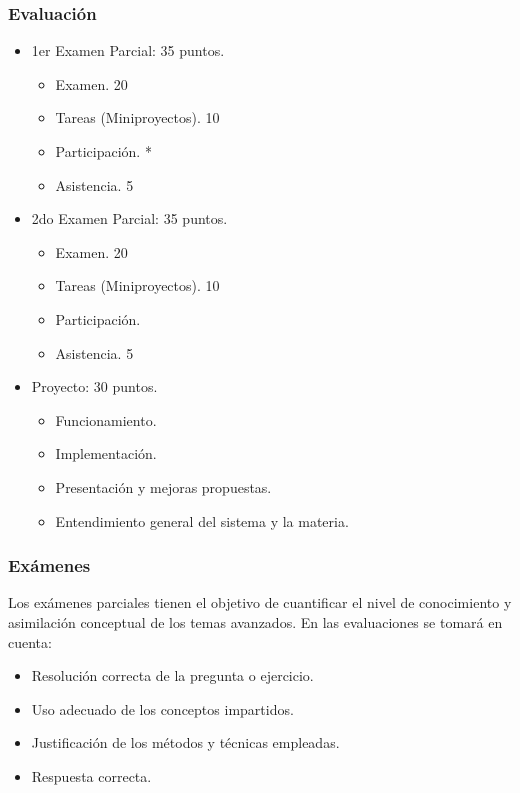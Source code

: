 \documentclass[10pt]{beamer}
\begin{document}
\begin{frame}
    \frametitle{Evaluación}
    \begin{itemize}
        \item 1er Examen Parcial: \alert{35 puntos}.
            \begin{itemize}
                \item Examen. \alert{20}
                \item Tareas (Miniproyectos). \alert{10}
                \item Participación. *
                \item Asistencia. \alert{5}
            \end{itemize}
        \item 2do Examen Parcial: \alert{35 puntos}.
            \begin{itemize}
                \item Examen. \alert{20}
                \item Tareas (Miniproyectos). \alert{10}
                \item Participación.
                \item Asistencia. \alert{5}
            \end{itemize}
        \item Proyecto: \alert{30 puntos}.
            \begin{itemize}
                \item Funcionamiento.
                \item Implementación.
                \item Presentación y mejoras propuestas.
                \item Entendimiento general del sistema y la materia.
            \end{itemize}
    \end{itemize}
\end{frame}

\begin{frame}
    \frametitle{Exámenes}
    Los exámenes parciales tienen el objetivo de cuantificar el nivel de conocimiento 
    y asimilación conceptual de los temas avanzados. En las evaluaciones se tomará en cuenta:
    \begin{itemize}
        \item Resolución correcta de la pregunta o ejercicio.
        \item Uso adecuado de los conceptos impartidos.
        \item Justificación de los métodos y técnicas empleadas.
        \item Respuesta correcta.
    \end{itemize}
\end{frame}
\end{document}
